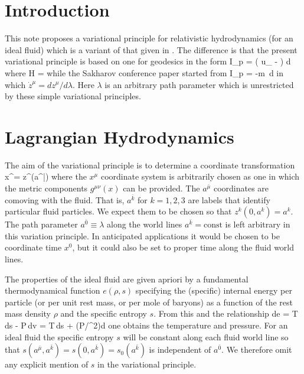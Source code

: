 
\section{Introduction}\label{sec:intro_level1}

This note proposes a variational principle for relativistic
hydrodynamics (for an ideal fluid) which is a variant of that
given in \cite{A:CWM96}.  The difference is that the present
variational principle is based on one for geodesics in the form
\be
     I_p = \int \left(  u_{\mu} -
                   \right) d \lambda
\ee
where
\be
 {\mathcal H} =  \left[ g^{\mu\nu}(z) u_{\mu} u_{\nu}
                                    + 1 \right]
\ee
while the Sakharov conference paper\cite{A:CWM96} started from
\be
   I_p =  -m \int\!\! 
\,d\lambda
\ee
in which $\dot{z}^\mu = dz^\mu/d\lambda$.
Here $\lambda$ is an arbitrary path parameter which is
unrestricted by these simple variational principles.


\section{Lagrangian Hydrodynamics}\label{sec:1_part_level1}

The aim of the variational principle is to determine a coordinate
transformation
\be
   x^\mu = z^\mu(a^{\bar{\nu}})
\ee
where the $x^\mu$ coordinate system is arbitrarily chosen as one
in which the metric components $g^{\mu\nu}(x)$ can be provided.
The $a^{\bar{\mu}}$ coordinates are comoving with the fluid. That
is, $a^{\bar{k}}$ for $k=1,2,3$ are labels that identify
particular fluid particles.
We expect them to be chosen so that $z^k(0,a^k) = a^k$.
The path parameter $a^{\bar{0}} \equiv \lambda$ along the world
lines $a^{\bar{k}} = \mbox{const}$ is left arbitrary in this
variation principle.
In anticipated applications it would be chosen to be coordinate
time $x^0$, but it could also be set to proper time along the
fluid world lines.

The properties of the ideal fluid are given apriori by a
fundamental thermodynamical function $e(\rho,s)$ specifying the
(specific) internal energy per particle (or per unit rest mass,
or per mole of baryons) as a function of the rest mass density
$\rho$ and the specific entropy $s$.
From this and the relationship
\be\label{eq:vh_first_law}
     de = T\,ds - P\,dv = T\,ds + (P/\rho^2)d\rho
\ee
one obtains the temperature and pressure.
For an ideal fluid the specific entropy $s$ will be constant
along each fluid world line so that $s(a^{\bar{\mu}},a^{\bar{k}})
= s(0,a^{\bar{k}}) = s_0(a^{\bar{k}})$ is independent of
$a^{\bar{0}}$.
We therefore omit any explicit mention of $s$ in the variational
principle.

